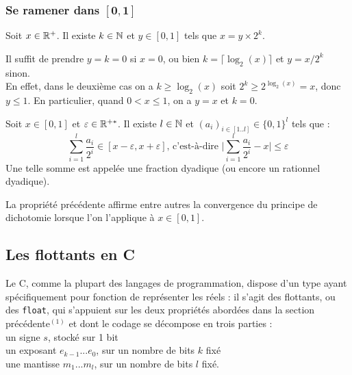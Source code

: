 		
		\subsubsection{Se ramener dans \(\bm{[0,1]}\)}
		
				Soit \(x\in\mathbb{R}^+\). Il existe \(k\in\mathbb{N}\) et \(y\in[0,1]\) tels que \(x=y\times2^k\).
			
			\begin{Preuve}
				Il suffit de prendre \(y=k=0\) si \(x=0\), ou bien \(k=\lceil\log_2(x)\rceil\) et \(y=x/2^k\) sinon. \\ En effet, dans le deuxième cas on a \(k\geq\log_2(x)\) soit \(2^k\geq 2^{\log_2(x)}=x\), donc \(y \leq 1\). En particulier, quand \(0 < x \leq 1\), on a \(y=x\) et \(k=0\).
			\end{Preuve}
			

			\eqskip{2mm}
			\begin{Propriete}
				Soit \(x\in[0,1]\) et \(\varepsilon\in\mathbb{R}^{+*}\). Il existe \(l\in\mathbb{N}\) et \((a_i)_{i\in[1..l]}\in\{0,1\}^l\) tels que :
					\[
						\sum_{i=1}^l \frac{a_i}{2^i} \in [x-\varepsilon,x+\varepsilon]\text{, c'est-à-dire } \bigg| \sum_{i=1}^l \frac{a_i}{2^i} - x \bigg| \leq \varepsilon
					\]
				Une telle somme est appelée une fraction dyadique (ou encore un rationnel dyadique).
			\end{Propriete}
			
			\begin{Remarque}
				La propriété précédente affirme entre autres la convergence du principe de dichotomie lorsque l'on l'applique à \(x\in[0,1]\).
			\end{Remarque}
			
		\subsection{Les flottants en C}
		
			Le C, comme la plupart des langages de programmation, dispose d'un type ayant spécifiquement pour fonction de représenter les réels : il s'agit des flottants, ou des \texttt{float}, qui s'appuient sur les deux propriétés abordées dans la section précédente\(^{(1)}\) et dont le codage se décompose en trois parties : \\
		 \bdot un signe \(s\), stocké sur 1 bit \\
		 \bdot un exposant \(e_{k-1}...e_0\), sur un nombre de bits \(k\) fixé \\
		 \bdot une mantisse \(m_1...m_l\), sur un nombre de bits \(l\) fixé.
		
